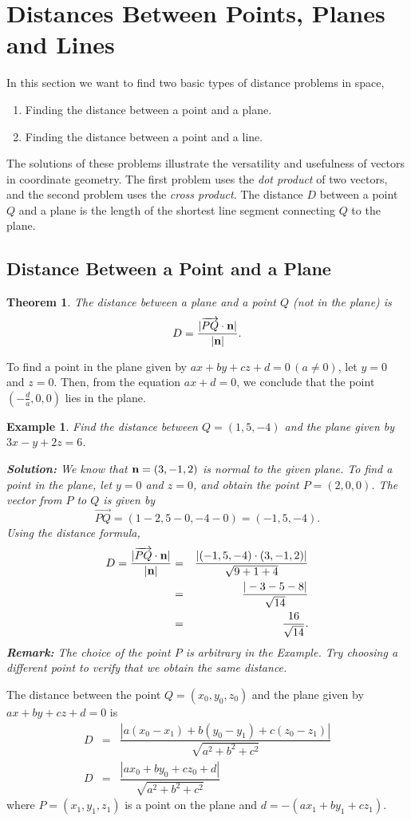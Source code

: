 \documentclass[titlepage,a4paper,12pt]{report}
\newtheorem{example}{Example}[section]
\newtheorem{theorem}{Theorem}[section]
\begin{document}
\section{Distances Between Points, Planes and Lines}
In this section we want to find two basic types of distance problems in space, 
\begin{enumerate}
\item Finding the distance between a point and a plane.
\item Finding the distance between a point and a line.
\end{enumerate}
The solutions of these problems illustrate the versatility and usefulness of vectors in coordinate geometry. The first problem uses the \textit{dot product} of two vectors, and the second problem uses the \textit{cross product}.  The distance $D$ between a point $Q$ and a plane is the length of the shortest line segment connecting $Q$ to the plane. 
\subsection{Distance Between a Point and a Plane}
\begin{theorem}
The distance between a plane and a point $Q$ (not in the plane) is 
\[D=\dfrac{|\overrightarrow{PQ}\cdot {\bf{n}}|}{|{\bf{n}}|}.\]
\end{theorem}
To find a point in the plane given by $ax+by+cz+d=0 \, (a\neq 0)$, let $y=0$ and $z=0$. Then, from the equation $ax+d=0$, we conclude that the point $(-\frac{d}{a}, 0, 0)$ lies in the plane.
\begin{example}
Find the distance between $Q=(1,5,-4)$ and the plane given by $3x-y+2z=6$.

\noindent \textbf{Solution:} We know that ${\bf{n}}=(3,-1,2)$ is normal to the given plane. To find a point in the plane, let $y=0$ and $z=0$, and obtain the point $P=(2,0,0)$. The vector from $P$ to $Q$ is given by 
\[\overrightarrow{PQ}=(1-2, 5-0, -4-0)=(-1, 5, -4).\]
Using the distance formula, 
\begin{eqnarray*}
D=\dfrac{|\overrightarrow{PQ}\cdot {\bf{n}}|}{|{\bf{n}}|} &=& \dfrac{|(-1,5,-4)\cdot (3,-1,2)|}{\sqrt{9+1+4}} \\
&=& \dfrac{|-3-5-8|}{\sqrt{14}}\\
&=& \dfrac{16}{\sqrt{14}}.
\end{eqnarray*}
\textbf{Remark:} The choice of the point $P$ is arbitrary in the Example. Try choosing a different point to verify that we obtain the same distance.
\end{example}
The distance between the point $Q=(x_0, y_0, z_0)$ and the plane given by $ax+by+cz+d=0$ is 
\begin{eqnarray*}
D &=& \dfrac{|a(x_0-x_1)+b(y_0-y_1)+c(z_0-z_1)|}{\sqrt{a^2+b^2+c^2}}\\
D &=& \dfrac{|ax_0+by_0+cz_0+d|}{\sqrt{a^2+b^2+c^2}}
\end{eqnarray*}
where $P=(x_1,y_1,z_1)$ is a point on the plane and $d=-(ax_1+by_1+cz_1)$.
\end{document}
